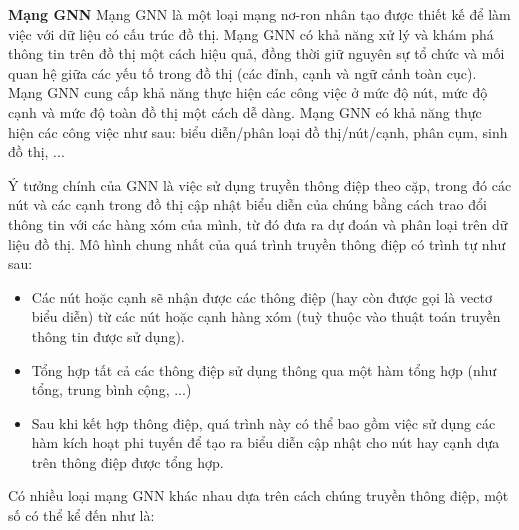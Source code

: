 \bigbreak\noindent
\textbf{Mạng GNN}
\bigbreak\noindent
Mạng GNN là một loại mạng nơ-ron nhân tạo được thiết kế để làm việc với dữ liệu có cấu trúc đồ thị. Mạng GNN có khả năng xử lý và khám phá thông tin trên đồ thị một cách hiệu quả, đồng thời giữ nguyên sự tổ chức và mối quan hệ giữa các yếu tố trong đồ thị (các đỉnh, cạnh và ngữ cảnh toàn cục). Mạng GNN cung cấp khả năng thực hiện các công việc ở mức độ nút, mức độ cạnh và mức độ toàn đồ thị một cách dễ dàng. Mạng GNN có khả năng thực hiện các công việc như sau: biểu diễn/phân loại đồ thị/nút/cạnh, phân cụm, sinh đồ thị, ... 

\bigbreak\noindent
Ý tưởng chính của GNN là việc sử dụng truyền thông điệp theo cặp, trong đó các nút và các cạnh trong đồ thị cập nhật biểu diễn của chúng bằng cách trao đổi thông tin với các hàng xóm của mình, từ đó đưa ra dự đoán và phân loại trên dữ liệu đồ thị. Mô hình chung nhất của quá trình truyền thông điệp có trình tự như sau:

\begin{itemize}
    \item Các nút hoặc cạnh sẽ nhận được các thông điệp (hay còn được gọi là vectơ biểu diễn) từ các nút hoặc cạnh hàng xóm (tuỳ thuộc vào thuật toán truyền thông tin được sử dụng).
    \item Tổng hợp tất cả các thông điệp sử dụng thông qua một hàm tổng hợp (như tổng, trung bình cộng, ...)
    \item  Sau khi kết hợp thông điệp, quá trình này có thể bao gồm việc sử dụng các hàm kích hoạt phi tuyến để tạo ra biểu diễn cập nhật cho nút hay cạnh dựa trên thông điệp được tổng hợp.
\end{itemize}

\bigbreak\noindent
Có nhiều loại mạng GNN khác nhau dựa trên cách chúng truyền thông điệp, một số có thể kể đến như là:

